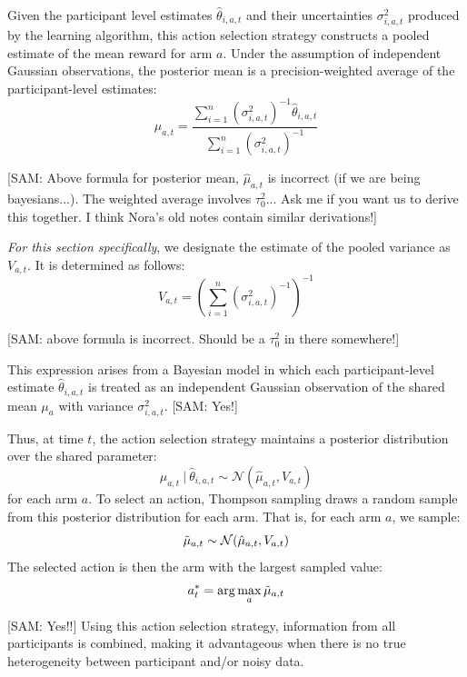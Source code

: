 \documentclass[letterpaper, 9pt]{extarticle}
\newcommand{\sam}[1]{
  {\color{blue} [SAM: {#1}]}
 }
\newcommand{\btk}[1]{%
  {\color{red} [\textbf{BTK}: {#1}]}%
}
\begin{document}

Given the participant level estimates $\hat{\theta}_{i,a,t}$ and their uncertainties $\sigma_{i,a,t}^2$ produced by the learning algorithm, this action selection strategy constructs a pooled estimate of the mean reward for arm $a$. Under the assumption of independent Gaussian observations, the posterior mean is a precision-weighted average of the participant-level estimates:
\[
\hat{\mu}_{a,t} = \frac{\sum_{i=1}^n (\sigma_{i,a,t}^2)^{-1}\hat{\theta}_{i,a,t}}{\sum_{i=1}^n (\sigma_{i,a,t}^2)^{-1}}
\]
\sam{Above formula for posterior mean, $\hat{\mu}_{a,t}$ is incorrect (if we are being bayesians...). The weighted average involves $\tau_0^2$...  Ask me if you want us to derive this together.  I think Nora's old notes contain similar derivations!}


\textit{For this section specifically}, we designate the estimate of the pooled variance as $V_{a,t}$. It is determined as follows:
\[
V_{a,t} = \left(\sum_{i=1}^n (\sigma_{i,a,t}^2)^{-1}
\right)^{-1}
\]
\sam{above formula is incorrect.  Should be a $\tau_0^2$ in there somewhere!}
This expression arises from a Bayesian model in which each participant-level estimate $\hat{\theta}_{i,a,t}$ is treated as an independent Gaussian observation of the shared mean $\mu_a$ with variance $\sigma_{i,a,t}^2$. \sam{Yes!} 

Thus, at time $t$, the action selection strategy maintains a posterior distribution over the shared parameter:
\[
\mu_{a,t} \ | \ \hat{\theta}_{i,a,t} \sim \mathcal{N}(\hat{\mu}_{a,t}, V_{a,t})
\]
for each arm $a$.  To select an action, Thompson sampling draws a random sample from this posterior distribution for each arm. That is, for each arm $a$, we sample: 
\[
\Tilde{\mu}_{a,t} \sim \mathcal{N}(\hat{\mu}_{a,t}, V_{a,t})
\]
The selected action is then the arm with the largest sampled value:
\[
a^*_{t} = \arg\max_a \Tilde{\mu}_{a,t}
\]
\sam{Yes!!} Using this action selection strategy, information from all participants is combined, making it advantageous when there is no true heterogeneity between participant and/or noisy data.
\end{document}
